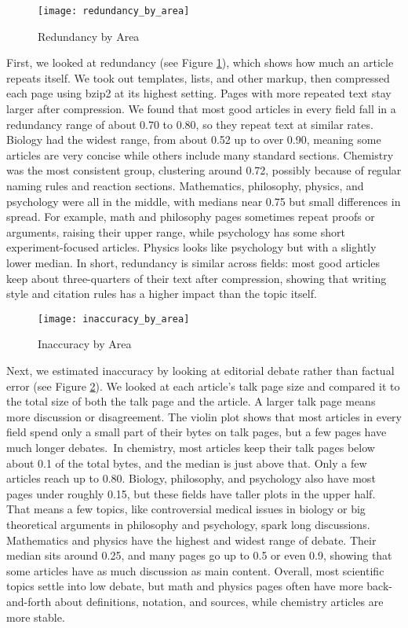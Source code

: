 \begin{figure}[h]
\centering\texttt{[image: redundancy\_by\_area]}
\caption{\label{fig:redundancy-by-area}Redundancy by Area}
\end{figure}
 
First, we looked at redundancy (see Figure \ref{fig:redundancy-by-area}), which shows how much an article repeats itself. We took out templates, lists, and other markup, then compressed each page using bzip2 at its highest setting. Pages with more repeated text stay larger after compression. We found that most good articles in every field fall in a redundancy range of about 0.70 to 0.80, so they repeat text at similar rates. Biology had the widest range, from about 0.52 up to over 0.90, meaning some articles are very concise while others include many standard sections. Chemistry was the most consistent group, clustering around 0.72, possibly because of regular naming rules and reaction sections. Mathematics, philosophy, physics, and psychology were all in the middle, with medians near 0.75 but small differences in spread. For example, math and philosophy pages sometimes repeat proofs or arguments, raising their upper range, while psychology has some short experiment-focused articles. Physics looks like psychology but with a slightly lower median. In short, redundancy is similar across fields: most good articles keep about three-quarters of their text after compression, showing that writing style and citation rules has a higher impact than the topic itself.

\begin{figure}[h]
\centering\texttt{[image: inaccuracy\_by\_area]}
\caption{\label{fig:inaccuracy-by-area}Inaccuracy by Area}
\end{figure}

Next, we estimated inaccuracy by looking at editorial debate rather than factual error (see Figure \ref{fig:inaccuracy-by-area}). We looked at each article’s talk page size and compared it to the total size of both the talk page and the article. A larger talk page means more discussion or disagreement. The violin plot shows that most articles in every field spend only a small part of their bytes on talk pages, but a few pages have much longer debates. In chemistry, most articles keep their talk pages below about 0.1 of the total bytes, and the median is just above that. Only a few articles reach up to 0.80. Biology, philosophy, and psychology also have most pages under roughly 0.15, but these fields have taller plots in the upper half. That means a few topics, like controversial medical issues in biology or big theoretical arguments in philosophy and psychology, spark long discussions. Mathematics and physics have the highest and widest range of debate. Their median sits around 0.25, and many pages go up to 0.5 or even 0.9, showing that some articles have as much discussion as main content. Overall, most scientific topics settle into low debate, but math and physics pages often have more back-and-forth about definitions, notation, and sources, while chemistry articles are more stable.

